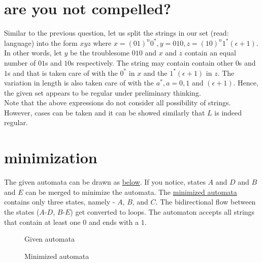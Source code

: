 \documentclass[11pt,letterpaper]{article}
\begin{document}
\section{are you not compelled?}
Similar to the previous question, let us split the strings in our set (read: language) into the form $xyz$ where $x=(01)^n0^*, y=010, z=(10)^n1^*(\epsilon+1)$. In other words, let $y$ be the troublesome $010$ and $x$ and $z$ contain an equal number of $01$s and $10$s respectively. The string may contain contain other $0$s and $1$s and that is taken care of with the $0^*$ in $x$ and the $1^*(\epsilon+1)$ in $z$. The variation in length is also taken care of with the $a^*, a={0,1}$ and $(\epsilon+1)$. Hence, the given set appears to be regular under preliminary thinking. \\
Note that the above expressions do not consider all possibility of strings. However, cases can be taken and it can be showed similarly that $L$ is indeed regular.
\pagebreak
\section{minimization}
The given automata can be drawn as \hyperref[fig:5a]{below}. If you notice, states $A$ and $D$ and $B$ and $E$ can be merged to minimize the automata. The \hyperref[fig:5a]{minimized automata} contains only three states, namely - $A$, $B$, and $C$. The bidirectional flow between the states ($A$-$D$, $B$-$E$) get converted to loops. The automaton accepts all strings that contain at least one $0$ and ends with a $1$.
\begin{figure}[!ht]
\label{fig:5a}
\centering
{}
\caption{Given automata}
\end{figure}
\begin{figure}[!ht]
\label{fig:5b}
\centering
{}
\caption{Minimized automata}
\end{figure}
\end{document}

